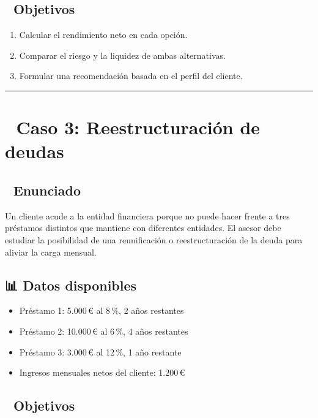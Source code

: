\documentclass[
  letterpaper,
  DIV=11,
  numbers=noendperiod]{scrreprt}
\providecommand{\tightlist}{%
  \setlength{\itemsep}{0pt}\setlength{\parskip}{0pt}}\usepackage{longtable,booktabs,array}
\begin{document}
\begin{tcolorbox}
\subsection{🎯 Objetivos}\label{objetivos-2}

\begin{enumerate}
\def\labelenumi{\arabic{enumi}.}
\tightlist
\item
  Calcular el rendimiento neto en cada opción.
\item
  Comparar el riesgo y la liquidez de ambas alternativas.
\item
  Formular una recomendación basada en el perfil del cliente.
\end{enumerate}

\begin{center}\rule{0.5\linewidth}{0.5pt}\end{center}

\section{📁 Caso 3: Reestructuración de
deudas}\label{caso-3-reestructuraciuxf3n-de-deudas}

\subsection{🧾 Enunciado}\label{enunciado-2}

Un cliente acude a la entidad financiera porque no puede hacer frente a
tres préstamos distintos que mantiene con diferentes entidades. El
asesor debe estudiar la posibilidad de una reunificación o
reestructuración de la deuda para aliviar la carga mensual.

\subsection{📊 Datos disponibles}\label{datos-disponibles-2}

\begin{itemize}
\tightlist
\item
  Préstamo 1: 5.000\,€ al 8\,\%, 2 años restantes
\item
  Préstamo 2: 10.000\,€ al 6\,\%, 4 años restantes
\item
  Préstamo 3: 3.000\,€ al 12\,\%, 1 año restante
\item
  Ingresos mensuales netos del cliente: 1.200\,€
\end{itemize}

\subsection{🎯 Objetivos}\label{objetivos-3}


\end{tcolorbox}
\end{document}
